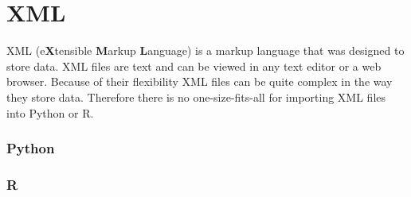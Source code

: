\documentclass[
]{book}
\newenvironment{Shaded}{\begin{snugshade}}{\end{snugshade}}
\newcommand{\DecValTok}[1]{\textcolor[rgb]{0.00,0.00,0.81}{#1}}
\newcommand{\FunctionTok}[1]{\textcolor[rgb]{0.00,0.00,0.00}{#1}}
\newcommand{\NormalTok}[1]{#1}
\newcommand{\OtherTok}[1]{\textcolor[rgb]{0.56,0.35,0.01}{#1}}
\newcommand{\SpecialCharTok}[1]{\textcolor[rgb]{0.00,0.00,0.00}{#1}}
\newcommand{\StringTok}[1]{\textcolor[rgb]{0.31,0.60,0.02}{#1}}
\begin{document}
\begin{Shaded}
\end{Shaded}

\hypertarget{xml}{%
\section{XML}\label{xml}}

XML (e\textbf{X}tensible \textbf{M}arkup \textbf{L}anguage) is a markup language that was designed to store data. XML files are text and can be viewed in any text editor or a web browser. Because of their flexibility XML files can be quite complex in the way they store data. Therefore there is no one-size-fits-all for importing XML files into Python or R.

\hypertarget{python-13}{%
\subsubsection*{Python}\label{python-13}}

\hypertarget{r-13}{%
\subsubsection*{R}\label{r-13}}
\end{document}

